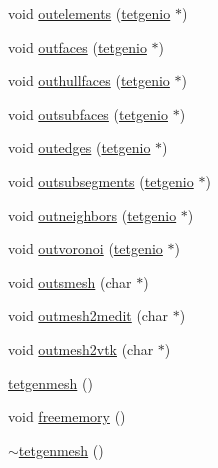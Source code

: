 \begin{DoxyCompactItemize}
void \hyperlink{classtetgenmesh_a5c66b2436d9a9600ce2bfcb164eb4057}{outelements} (\hyperlink{classtetgenio}{tetgenio} $\ast$)
\item 
void \hyperlink{classtetgenmesh_a66e4aa0af0703d1cb1a88e6d5f5a7fe6}{outfaces} (\hyperlink{classtetgenio}{tetgenio} $\ast$)
\item 
void \hyperlink{classtetgenmesh_a761d7284859037c6060a3526bff309b9}{outhullfaces} (\hyperlink{classtetgenio}{tetgenio} $\ast$)
\item 
void \hyperlink{classtetgenmesh_a357976a26bd46ca731e3492f6d96e7eb}{outsubfaces} (\hyperlink{classtetgenio}{tetgenio} $\ast$)
\item 
void \hyperlink{classtetgenmesh_ad3e1b0a623146c7bf47e9fdf0dc905e9}{outedges} (\hyperlink{classtetgenio}{tetgenio} $\ast$)
\item 
void \hyperlink{classtetgenmesh_a9074a5c187967e3d4a7a7851b4900c09}{outsubsegments} (\hyperlink{classtetgenio}{tetgenio} $\ast$)
\item 
void \hyperlink{classtetgenmesh_a0969236328cd4e47deac4f6f59659eb5}{outneighbors} (\hyperlink{classtetgenio}{tetgenio} $\ast$)
\item 
void \hyperlink{classtetgenmesh_a684c38b1c702ea2a91efe8963f2d788b}{outvoronoi} (\hyperlink{classtetgenio}{tetgenio} $\ast$)
\item 
void \hyperlink{classtetgenmesh_a67e2e2af4832c793325d3c76c305ea6e}{outsmesh} (char $\ast$)
\item 
void \hyperlink{classtetgenmesh_a250644e2c1dc425aa602744de3240964}{outmesh2medit} (char $\ast$)
\item 
void \hyperlink{classtetgenmesh_a0b397f6ed04c0e52fc156dd5d0db71d5}{outmesh2vtk} (char $\ast$)
\item 
\hyperlink{classtetgenmesh_adaad2fe67160e2d4564fcf20fcb841ee}{tetgenmesh} ()
\item 
void \hyperlink{classtetgenmesh_ade805f03ec7ca1b4623c8148fb915278}{freememory} ()
\item 
\hyperlink{classtetgenmesh_a45f5fe961a2faf0adf93de742f308372}{$\sim$tetgenmesh} ()
\end{DoxyCompactItemize}
